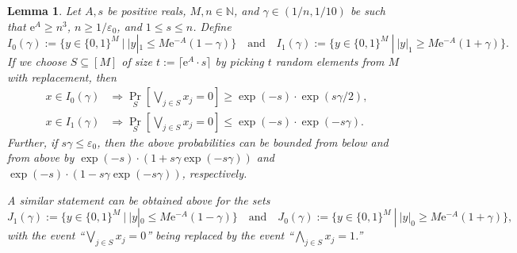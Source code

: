 \documentclass[11pt]{article}
\numberwithin{equation}{section}
\newtheorem{lemma}[theorem]{Lemma}
\theoremstyle{definition}
\theoremstyle{plain}
\newcommand{\eee}{\mathrm e}
\begin{document}
\begin{lemma}
\label{lem:technicalORAND}
Let $A,s$ be positive reals, $M,n\in\mathbb{N}$,  and $\gamma\in ({1}/{n},{1}/{10})$ be such that $\eee^A \geq n^3$, $n \geq {1}/{\varepsilon_0}$, and $1\leq s\leq n$. Define
\[
  I_0(\gamma) := \{y\in \{0,1\}^M\ |\ |y|_1\leq M\eee^{-A}(1-\gamma)\}\quad\text{and}\quad I_1(\gamma) := \{y\in \{0,1\}^M\ |\ |y|_1\geq M\eee^{-A}(1+\gamma)\}.
\]
If we choose $S\subseteq [M]$ of size
$t := \lceil \eee^{A}\cdot s\rceil$ by picking $t$ random elements
from $M$ with replacement, then
\begin{align*}
x\in I_0(\gamma) &\Rightarrow \Pr_{S}\left[\bigvee_{j\in S}x_j = 0\right] \geq \exp(-s)\cdot\exp(s\gamma/2), \\
x\in I_1(\gamma) &\Rightarrow \Pr_{S}\left[\bigvee_{j\in S}x_j = 0\right] \leq \exp(-s)\cdot \exp(-s\gamma).
\end{align*}
Further, if $s\gamma \leq \varepsilon_0$, then the above probabilities can be 
%
bounded from below and from above  %
by $\exp(-s)\cdot (1+s\gamma\exp(-s\gamma))$ and
$\exp(-s)\cdot (1-s\gamma\exp(-s\gamma))$, %
respectively.  %

A similar statement can be obtained above for the sets
\[
  J_1(\gamma) := \{y\in \{0,1\}^M\ |\ |y|_0\leq M\eee^{-A}(1-\gamma)\}\quad\text{and}\quad J_0(\gamma) := \{y\in \{0,1\}^M\ |\ |y|_0\geq M\eee^{-A}(1+\gamma)\},
\]
with the event ``$\bigvee_{j\in S}x_j = 0$'' being replaced by the
event ``$\bigwedge_{j\in S}x_j = 1$.''
\end{lemma}
\end{document}
